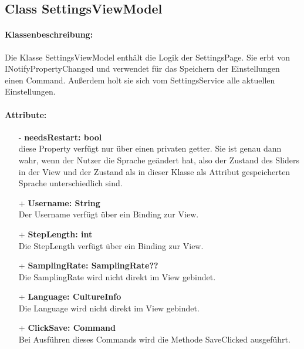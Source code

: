 \documentclass[a4paper,12pt]{article}
\begin{document}
\subsection{Class SettingsViewModel}

\paragraph{Klassenbeschreibung:}
Die Klasse SettingsViewModel enthält die Logik der SettingsPage. Sie erbt von INotifyPropertyChanged und verwendet für das Speichern der Einstellungen einen Command. Außerdem holt sie sich vom SettingsService alle aktuellen Einstellungen.
\paragraph{Attribute:}
\begin{itemize}
	\item[-] \textbf{needsRestart: bool}\\ diese Property verfügt nur über einen privaten getter. Sie ist genau dann wahr, wenn der Nutzer die Sprache geändert hat, also der Zustand des Sliders in der View und der Zustand als in dieser Klasse als Attribut gespeicherten Sprache unterschiedlich sind.
	\item[+] \textbf{Username: String}\\Der Username verfügt über ein Binding zur View.
	\item[+] \textbf{StepLength: int}\\Die StepLength verfügt über ein Binding zur View. 
	\item[+] \textbf{SamplingRate: SamplingRate??}\\Die SamplingRate wird nicht direkt im View gebindet.
	\item[+] \textbf{Language: CultureInfo}\\Die Language wird nicht direkt im View gebindet. 
	\item[+] \textbf{ClickSave: Command}\\Bei Ausführen dieses Commands wird die Methode SaveClicked ausgeführt. 
\end{itemize}
\end{document}
